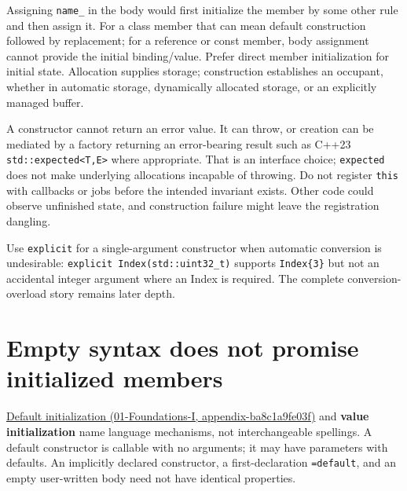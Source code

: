 Assigning \texttt{name\_} in the body would first initialize the member by some other rule and then assign it. For a class member that can mean default construction followed by replacement; for a reference or const member, body assignment cannot provide the initial binding/value. Prefer direct member initialization for initial state. Allocation supplies storage; construction establishes an occupant, whether in automatic storage, dynamically allocated storage, or an explicitly managed buffer.

A constructor cannot return an error value. It can throw, or creation can be mediated by a factory returning an error-bearing result such as C++23 \texttt{std::expected\textless{}T,E\textgreater{}} where appropriate. That is an interface choice; \texttt{expected} does not make underlying allocations incapable of throwing. Do not register \texttt{this} with callbacks or jobs before the intended invariant exists. Other code could observe unfinished state, and construction failure might leave the registration dangling.

Use \texttt{explicit} for a single-argument constructor when automatic conversion is undesirable: \texttt{explicit\ Index(std::uint32\_t)} supports \texttt{Index\{3\}} but not an accidental integer argument where an Index is required. The complete conversion-overload story remains later depth.

\section{Empty syntax does not promise initialized members}\label{05-engine-i-ch003-empty-syntax-does-not-promise-initialized-members}

\href{../01-Foundations-I/main.pdf\#nameddest=appendix-ba8c1a9fe03f}{Default initialization (01-Foundations-I, appendix-ba8c1a9fe03f)} and \textbf{value initialization} name language mechanisms, not interchangeable spellings. A default constructor is callable with no arguments; it may have parameters with defaults. An implicitly declared constructor, a first-declaration \texttt{=default}, and an empty user-written body need not have identical properties.

